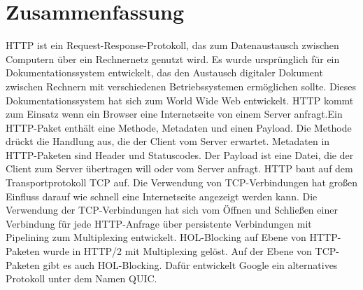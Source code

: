 \documentclass{llncs}
\begin{document}
\section{Zusammenfassung}
HTTP ist ein Request-Response-Protokoll, das zum Datenaustausch zwischen Computern über ein Rechnernetz genutzt wird. Es wurde ursprünglich für ein Dokumentationssystem entwickelt, das den Austausch digitaler Dokument zwischen Rechnern mit verschiedenen Betriebssystemen ermöglichen sollte. Dieses Dokumentationssystem hat sich zum World Wide Web entwickelt. 
HTTP kommt zum Einsatz wenn ein Browser eine Internetseite von einem Server anfragt.\newline Ein HTTP-Paket enthält eine Methode, Metadaten und einen Payload. Die Methode drückt die Handlung aus, die der Client vom Server erwartet. Metadaten in HTTP-Paketen sind Header und Statuscodes. Der Payload ist eine Datei, die der Client zum Server übertragen will oder vom Server anfragt. \newline
HTTP baut auf dem Transportprotokoll TCP auf.
Die Verwendung von TCP-Verbindungen hat großen Einfluss darauf wie schnell eine Internetseite angezeigt werden kann. Die Verwendung der TCP-Verbindungen hat sich vom Öffnen und Schließen einer Verbindung für jede HTTP-Anfrage über persistente Verbindungen mit Pipelining zum Multiplexing entwickelt. \newline
HOL-Blocking auf Ebene von HTTP-Paketen wurde in HTTP/2 mit Multiplexing gelöst.
 Auf der Ebene von TCP-Paketen gibt es auch HOL-Blocking. Dafür entwickelt Google ein alternatives Protokoll unter dem Namen QUIC. 


\end{document}
